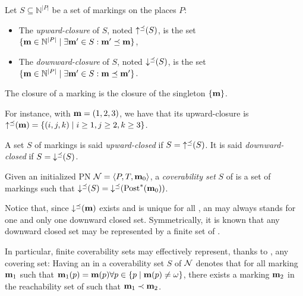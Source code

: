\begin{defi}
  Let $S \subseteq \mathbb{N}^{|P|}$ be a set of markings on the places $P$:
  \begin{itemize}
    \item The \emph{upward-closure} of $S$, noted $\operatorname{\uparrow^\preceq}(S)$, is the set
      $\{\mathbf{m} \in \mathbb{N}^{|P|} \mid \exists \mathbf{m'} \in S : \mathbf{m'} \preceq \mathbf{m}\}$,
    \item The \emph{downward-closure} of $S$, noted $\operatorname{\downarrow^\preceq}(S)$, is the set
      $\{\mathbf{m} \in \mathbb{N}^{|P|} \mid \exists \mathbf{m'} \in S : \mathbf{m} \preceq \mathbf{m'}\}$.
  \end{itemize}
  The closure of a marking \mar is the closure of the singleton $\{\mathbf{m}\}$.
\end{defi}

For instance, with $\mathbf{m} = (1, 2, 3)$, we have that its upward-closure is $\operatorname{\uparrow^\preceq}(\mathbf{m}) = \{(i, j, k) \mid i \geq 1, j \geq 2, k \geq 3\}$.

\begin{defi}
  A set $S$ of markings is said \emph{upward-closed} if $S = \operatorname{\uparrow^\preceq}(S)$.
  It is said \emph{downward-closed} if $S = \operatorname{\downarrow^\preceq}(S)$.
\end{defi}

\begin{defi}
  Given an initialized \ac{PN} $\mathcal{N} = \langle P,T, \mathbf{m}_0\rangle$, a \emph{coverability set} $S$ of \N is a set of markings such that $\operatorname{\downarrow^\preceq}(S) = \operatorname{\downarrow^\preceq}(\operatorname{Post}^*(\mathbf{m}_0))$.
\end{defi}

Notice that, since $\operatorname{\downarrow^\preceq}(\mathbf{m})$ exists and is unique for all \omark \mar, an \omark may always stands for one and only one downward closed set.
Symmetrically, it is known that any downward closed set may be represented by a finite set of \omarks \citep{Geeraerts06}. 

In particular, finite coverability sets may effectively represent, thanks to \omarks, any covering set:
Having an \omark \mar in a coverability set $S$ of $\mathcal{N}$ denotes that for all marking $\mathbf{m}_1$ such that $\mathbf{m}_1(p) = \mathbf{m}(p) \forall p \in \{p \mid \mathbf{m}(p) \neq \omega\}$, there exists a marking $\mathbf{m}_2$ in the reachability set of \N such that $\mathbf{m}_1 \prec \mathbf{m}_2$.


